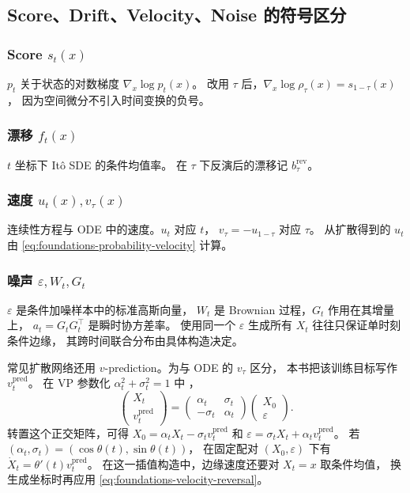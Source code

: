 \subsection{Score、Drift、Velocity、Noise 的符号区分}

\subsubsection*{Score \(s_t(x)\)}
\(p_t\) 关于状态的对数梯度 \(\nabla_x\log p_t(x)\)。
改用 \(\tau\) 后，\(\nabla_x\log\rho_\tau(x)=s_{1-\tau}(x)\)，
因为空间微分不引入时间变换的负号。

\subsubsection*{漂移 \(f_t(x)\)}
\(t\) 坐标下 Itô SDE 的条件均值率。
在 \(\tau\) 下反演后的漂移记 \(b_\tau^{\mathrm{rev}}\)。

\subsubsection*{速度 \(u_t(x),v_\tau(x)\)}
连续性方程与 ODE 中的速度。\(u_t\) 对应 \(t\)，
\(v_\tau=-u_{1-\tau}\) 对应 \(\tau\)。
从扩散得到的 \(u_t\) 由 \eqref{eq:foundations-probability-velocity} 计算。

\subsubsection*{噪声 \(\varepsilon,W_t,G_t\)}
\(\varepsilon\) 是条件加噪样本中的标准高斯向量，
\(W_t\) 是 Brownian 过程，\(G_t\) 作用在其增量上，
\(a_t=G_tG_t^\top\) 是瞬时协方差率。
使用同一个 \(\varepsilon\) 生成所有 \(X_t\) 往往只保证单时刻条件边缘，
其跨时间联合分布由具体构造决定。

常见扩散网络还用 \(v\)-prediction。为与 ODE 的 \(v_\tau\) 区分，
本书把该训练目标写作 \(v_t^{\mathrm{pred}}\)。
在 VP 参数化 \(\alpha_t^2+\sigma_t^2=1\) 中
\cite{salimans2022distill}，
\begin{equation}
  \begin{pmatrix}X_t\\v_t^{\mathrm{pred}}\end{pmatrix}
   =\begin{pmatrix}\alpha_t & \sigma_t\\-\sigma_t & \alpha_t\end{pmatrix}
       \begin{pmatrix}X_0\\\varepsilon\end{pmatrix}.
  \label{eq:foundations-vpred}
\end{equation}
转置这个正交矩阵，可得 \(X_0=\alpha_tX_t-\sigma_t v_t^{\mathrm{pred}}\) 和
\(\varepsilon=\sigma_tX_t+\alpha_t v_t^{\mathrm{pred}}\)。
若 \((\alpha_t,\sigma_t)=(\cos\theta(t),\sin\theta(t))\)，
在固定配对 \((X_0,\varepsilon)\) 下有
\(\dot X_t=\theta'(t)v_t^{\mathrm{pred}}\)。
在这一插值构造中，边缘速度还要对 \(X_t=x\) 取条件均值，
换生成坐标时再应用 \eqref{eq:foundations-velocity-reversal}。
